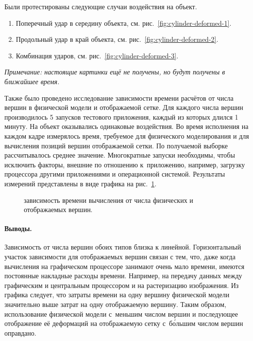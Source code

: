 \documentclass[a4paper, 14pt, titlepage]{extarticle}
\newcommand{\note}[1]{\textit{Примечание: #1}}
\newcommand{\includefigure}[3][]{
    \begin{figure}[!htb]
      \center{\texttt{[image: \#2]}}
      \caption{#3} \label{fig:#2}
    \end{figure}
  }
\begin{document}
        Были протестированы следующие случаи воздействия на объект.
        \begin{enumerate}
          \item Поперечный удар в середину объекта, см. рис.~\ref{fig:cylinder-deformed-1}.
          \item Продольный удар в край объекта, см. рис.~\ref{fig:cylinder-deformed-2}.
          \item Комбинация ударов, см. рис.~\ref{fig:cylinder-deformed-3}.
        \end{enumerate}

        \note{настоящие картинки ещё не получены, но будут получены в ближайшее время.}

        Также было проведено исследование зависимости времени расчётов от числа вершин в физической
        модели и отображаемой сетке. Для каждого числа вершин производилось 5 запусков тестового
        приложения, каждый из которых длился 1 минуту. На объект оказывались одинаковые воздействия. Во время
        исполнения на каждом кадре измерялось время, требуемое для физического моделирования и для
        вычисления позиций вершин отображаемой сетки. По получаемой выборке рассчитывалось
        среднее значение. Многократные запуски необходимы, чтобы исключить
        факторы, внешние по отношению к~приложению, например, загрузку процессора другими приложениями
        и операционной системой. Результаты измерений представлены в виде графика на рис.~\ref{fig:time-plot}.

        \includefigure[width=1\linewidth]{time-plot}{зависимость времени вычисления от числа физических и отображаемых вершин.}

        \paragraph{Выводы.} Зависимость от числа вершин обоих типов близка к линейной.
        Горизонтальный участок зависимости для отображаемых вершин связан с тем, что, даже когда
        вычисления на графическом процессоре занимают очень мало времени, имеются
        постоянные накладные расходы времени. Например, на передачу данных между графическим и центральным
        процессором и на растеризацию изображения. Из графика следует, что затраты времени на
        одну вершину физической модели значительно выше затрат на одну отображаемую вершину. Таким
        образом, использование физической модели с~меньшим числом вершин и последующее отображение
        её деформаций на отображаемую сетку с~б\'{о}льшим числом вершин оправдано.
\end{document}
